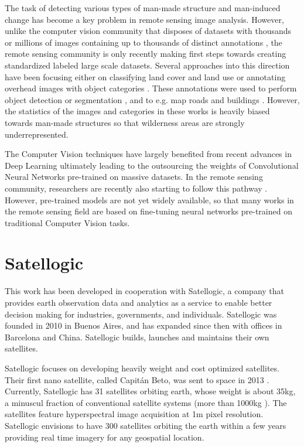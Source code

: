 The task of detecting various types of man-made structure and man-induced change has become a key problem in remote sensing image analysis. However, unlike the computer vision community that disposes of datasets with thousands or millions of images containing up to thousands of distinct annotations \parencite{everingham2010, deng2009, lin2014, krasin2016}, the remote sensing community is only recently making first steps towards creating standardized labeled large scale datasets. Several approaches into this direction have been focusing either on classifying land cover and land use \parencite{sumbul2019} or annotating overhead images with object categories \parencite{vanetten2018, lam2018}. These annotations were used to perform object detection or segmentation \parencite{yang2010, krasin2016}, and to e.g. map roads and buildings \parencite{vanetten2018, vanetten2019}. However, the statistics of the images and categories in these works is heavily biased towards man-made structures so that wilderness areas are strongly underrepresented. 

The Computer Vision techniques have largely benefited from recent advances in Deep Learning ultimately leading to the outsourcing the weights of Convolutional Neural Networks pre-trained on massive datasets. In the remote sensing community, researchers are recently also starting to follow this pathway \parencite{sumbul2019}. However, pre-trained models are not yet widely available, so that many works in the remote sensing field are based on fine-tuning neural networks  pre-trained on traditional Computer Vision tasks.

\section{Satellogic}

This work has been developed in cooperation with Satellogic, a company that provides earth observation data and analytics as a service to enable better decision making for industries, governments, and individuals. Satellogic was founded in 2010 in Buenos Aires, and has expanded since then with offices in Barcelona and China. Satellogic builds, launches and maintains their own satellites.

Satellogic focuses on developing heavily weight and cost optimized satellites. Their first nano satellite, called Capitán Beto, was sent to space in 2013 \parencite{wiki_satellogic}. Currently, Satellogic has 31 satellites orbiting earth, whose weight is about 35kg, a minuscul fraction of conventional satellite systems (more than 1000kg \parencite{satellogic_youtube}). The satellites feature hyperspectral image acquisition at 1m pixel resolution. Satellogic envisions to have 300 satellites orbiting the earth within a few years providing real time imagery for any geospatial location. 


